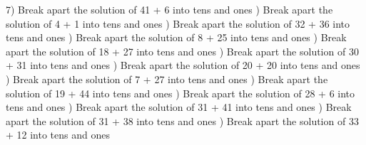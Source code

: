 \documentclass{article}%
\begin{document}
7) Break apart the solution of 41 + 6 into tens and ones%
\newline%
\newline%
) Break apart the solution of 4 + 1 into tens and ones%
\newline%
\newline%
) Break apart the solution of 32 + 36 into tens and ones%
\newline%
\newline%
) Break apart the solution of 8 + 25 into tens and ones%
\newline%
\newline%
) Break apart the solution of 18 + 27 into tens and ones%
\newline%
\newline%
) Break apart the solution of 30 + 31 into tens and ones%
\newline%
\newline%
) Break apart the solution of 20 + 20 into tens and ones%
\newline%
\newline%
) Break apart the solution of 7 + 27 into tens and ones%
\newline%
\newline%
) Break apart the solution of 19 + 44 into tens and ones%
\newline%
\newline%
) Break apart the solution of 28 + 6 into tens and ones%
\newline%
\newline%
) Break apart the solution of 31 + 41 into tens and ones%
\newline%
\newline%
) Break apart the solution of 31 + 38 into tens and ones%
\newline%
\newline%
) Break apart the solution of 33 + 12 into tens and ones%
\newline%
\end{document}
